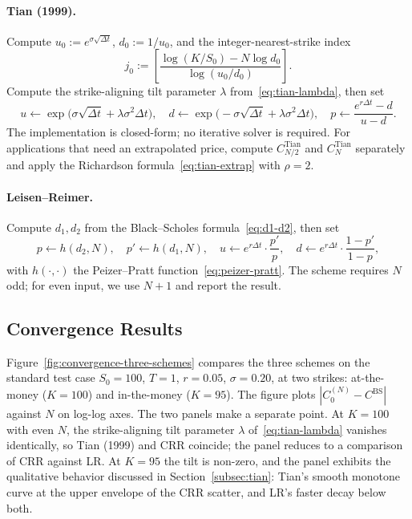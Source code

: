 \documentclass[11pt,a4paper]{article}
\theoremstyle{plain}
\theoremstyle{definition}
\begin{document}
\paragraph{Tian (1999).} Compute $u_0 := e^{\sigma\sqrt{\Delta t}}$,
$d_0 := 1/u_0$, and the integer-nearest-strike index
\[
j_0 := \left[\frac{\log(K/S_0) - N \log d_0}{\log(u_0/d_0)}\right].
\]
Compute the strike-aligning tilt parameter $\lambda$
from~\eqref{eq:tian-lambda}, then set
\[
u \gets \exp\!\bigl(\sigma\sqrt{\Delta t} + \lambda\sigma^2\Delta t\bigr),
\quad
d \gets \exp\!\bigl(-\sigma\sqrt{\Delta t} + \lambda\sigma^2\Delta t\bigr),
\quad
p \gets \frac{e^{r\Delta t} - d}{u - d}.
\]
The implementation is closed-form; no iterative solver is required.
For applications that need an extrapolated price, compute
$C^{\mathrm{Tian}}_{N/2}$ and $C^{\mathrm{Tian}}_N$ separately and apply
the Richardson formula~\eqref{eq:tian-extrap} with $\rho = 2$.

\paragraph{Leisen--Reimer.} Compute $d_1, d_2$ from the Black--Scholes
formula~\eqref{eq:d1-d2}, then set
\[
p \gets h(d_2, N), \quad p' \gets h(d_1, N), \quad
u \gets e^{r\Delta t} \cdot \frac{p'}{p}, \quad
d \gets e^{r\Delta t} \cdot \frac{1 - p'}{1 - p},
\]
with $h(\cdot, \cdot)$ the Peizer--Pratt
function~\eqref{eq:peizer-pratt}. The scheme requires $N$ odd; for even
input, we use $N + 1$ and report the result.

\subsection{Convergence Results}
\label{subsec:convergence-results}

Figure~\ref{fig:convergence-three-schemes} compares the three schemes
on the standard test case $S_0 = 100$, $T = 1$, $r = 0.05$,
$\sigma = 0.20$, at two strikes: at-the-money ($K = 100$) and
in-the-money ($K = 95$). The figure plots
$|C_0^{(N)} - C^{\mathrm{BS}}|$ against $N$ on log-log axes. The two
panels make a separate point. At $K = 100$ with even $N$, the
strike-aligning tilt parameter $\lambda$
of~\eqref{eq:tian-lambda} vanishes identically, so Tian (1999) and
CRR coincide; the panel reduces to a comparison of CRR against LR.
At $K = 95$ the tilt is non-zero, and the panel exhibits the
qualitative behavior discussed in
Section~\ref{subsec:tian}: Tian's smooth monotone curve at the
upper envelope of the CRR scatter, and LR's faster decay below
both.
\end{document}
